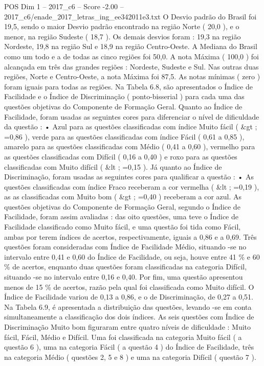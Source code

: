 \begin{textsample}{POS Dim 1 – 2017\_c6 – Score -2.00 – 2017\_c6/enade\_2017\_letras\_ing\_ee342011e3.txt}
O Desvio padrão do Brasil foi 19,5, sendo o maior Desvio padrão encontrado na região Norte ( 20,0 ), e o menor, na região Sudeste ( 18,7 ).
Os demais desvios foram : 19,3 na região Nordeste, 19,8 na região Sul e 18,9 na região Centro-Oeste.
A Mediana do Brasil como um todo e a de todas as cinco regiões foi 50,0.
A nota Máxima ( 100,0 ) foi alcançada em três das grandes regiões : Nordeste, Sudeste e Sul.
Nas outras duas regiões, Norte e Centro-Oeste, a nota Máxima foi 87,5.
As notas mínimas ( zero ) foram iguais para todas as regiões.
Na Tabela 6.8, são apresentados o Índice de Facilidade e o Índice de Discriminação ( ponto-bisserial ) para cada uma das questões objetivas do Componente de Formação Geral.
Quanto ao Índice de Facilidade, foram usadas as seguintes cores para diferenciar o nível de dificuldade da questão : • Azul para as questões classificadas com índice Muito fácil ( \&gt ; =0,86 ), verde para as questões classificadas com índice Fácil ( 0,61 a 0,85 ), amarelo para as questões classificadas com Médio ( 0,41 a 0,60 ), vermelho para as questões classificadas com Difícil ( 0,16 a 0,40 ) e roxo para as questões classificadas com Muito difícil ( \&lt ; =0,15 ).
Já quanto ao Índice de Discriminação, foram usadas as seguintes cores para qualificar a questão : • As questões classificadas com índice Fraco receberam a cor vermelha ( \&lt ; =0,19 ), as as classificadas com Muito bom ( \&gt ; =0,40 ) receberam a cor azul.
As questões objetivas do Componente de Formação Geral, segundo o Índice de Facilidade, foram assim avaliadas : das oito questões, uma teve o Índice de Facilidade classificado como Muito fácil, e uma questão foi tida como Fácil, ambas por terem índices de acertos, respectivamente, iguais a 0,86 e a 0,69.
Três questões foram consideradas com Índice de Facilidade Médio, situando -se no intervalo entre 0,41 e 0,60 do Índice de Facilidade, ou seja, houve entre 41 \% e 60 \% de acertos, enquanto duas questões foram classificadas na categoria Difícil, situando -se no intervalo entre 0,16 e 0,40.
Por fim, uma questão apresentou menos de 15 \% de acertos, razão pela qual foi classificada como Muito difícil.
O Índice de Facilidade variou de 0,13 a 0,86, e o de Discriminação, de 0,27 a 0,51.
Na Tabela 6.9, é apresentada a distribuição das questões, levando -se em conta simultaneamente a classificação dos dois índices.
As seis questões com Índice de Discriminação Muito bom figuraram entre quatro níveis de dificuldade : Muito fácil, Fácil, Médio e Difícil.
Uma foi classificada na categoria Muito fácil ( a questão 6 ), uma na categoria Fácil ( a questão 4 ) do Índice de Facilidade, três na categoria Médio ( questões 2, 5 e 8 ) e uma na categoria Difícil ( questão 7 ).

\end{textsample}
